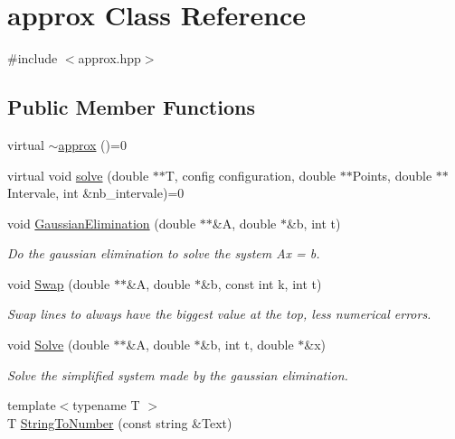 \hypertarget{classapprox}{}\section{approx Class Reference}
\label{classapprox}


{\ttfamily \#include $<$approx.\+hpp$>$}

\subsection*{Public Member Functions}
\begin{DoxyCompactItemize}
\item 
virtual \mbox{\hyperlink{classapprox_a125182047a0ed636dbbe045f0734f39b}{$\sim$approx}} ()=0
\item 
virtual void \mbox{\hyperlink{classapprox_a56625b15475b445d745951979beb33cd}{solve}} (double $\ast$$\ast$T, config configuration, double $\ast$$\ast$Points, double $\ast$$\ast$Intervale, int \&nb\+\_\+intervale)=0
\item 
void \mbox{\hyperlink{classapprox_a2ebff31fe5a8710ead73f59d3c3d51fe}{Gaussian\+Elimination}} (double $\ast$$\ast$\&A, double $\ast$\&b, int t)
\begin{DoxyCompactList}\small\item\em Do the gaussian elimination to solve the system Ax = b. \end{DoxyCompactList}\item 
void \mbox{\hyperlink{classapprox_abdc5782a1aede87d2776dda3c4670762}{Swap}} (double $\ast$$\ast$\&A, double $\ast$\&b, const int k, int t)
\begin{DoxyCompactList}\small\item\em Swap lines to always have the biggest value at the top, less numerical errors. \end{DoxyCompactList}\item 
void \mbox{\hyperlink{classapprox_a526c22dfc3fe842580ca8ee388c28ef1}{Solve}} (double $\ast$$\ast$\&A, double $\ast$\&b, int t, double $\ast$\&x)
\begin{DoxyCompactList}\small\item\em Solve the simplified system made by the gaussian elimination. \end{DoxyCompactList}\item 
{\footnotesize template$<$typename T $>$ }\\T \mbox{\hyperlink{classapprox_aee0082214b62e8ee5ad5194260414ad7}{String\+To\+Number}} (const string \&Text)
\item 

\end{DoxyCompactItemize}
